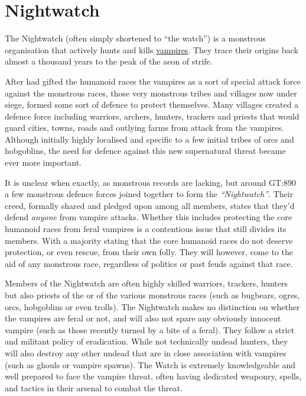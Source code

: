 \section{Nightwatch}
\label{sec:Nightwatch}

The Nightwatch (often simply shortened to ``the watch'') is a monstrous
organisation that actively hunts and kills \hyperref[sec:Vampires]{vampires}.
They trace their origins back almost a thousand years to the peak of the aeon
of strife.

After  had gifted the humanoid races the vampires as a
sort of special attack force against the monstrous races, those very monstrous
tribes and villages now under siege, formed some sort of defence to protect
themselves. Many villages created a defence force including warriors, archers,
hunters, trackers and priests that would guard cities, towns, roads and
outlying farms from attack from the vampires. Although initially highly
localised and specific to a few initial tribes of orcs and hobgoblins, the
need for defence against this new supernatural threat became ever more
important.

It is unclear when exactly, as monstrous records are lacking, but around
GT:890 a few monstrous defence forces joined together to form the
\emph{``Nightwatch''}. Their creed, formally shared and pledged upon among all
members, states that they'd defend \emph{anyone} from vampire attacks. Whether
this includes protecting the core humanoid races from feral vampires is a
contentious issue that still divides its members. With a majority stating that
the core humanoid races do not deserve protection, or even rescue, from their
own folly. They will however, come to the aid of any monstrous race,
regardless of politics or past feuds against that race.

Members of the Nightwatch are often highly skilled warriors, trackers, hunters
but also priests of the  or  of the
various monstrous races (such as bugbears, ogres, orcs, hobgoblins or even
trolls). The Nightwatch makes no distinction on whether the vampires are feral
or not, and will also not spare any obviously innocent vampire (such as those
recently turned by a bite of a feral). They follow a strict and militant
policy of eradication. While not technically undead hunters, they will also
destroy any other undead that are in close association with vampires (such as
ghouls or vampire spawns). The Watch is extremely knowledgeable and well
prepared to face the vampire threat, often having dedicated weaponry, spells,
and tactics in their arsenal to combat the threat.

